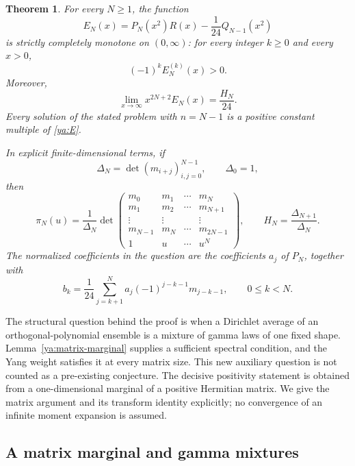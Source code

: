 \documentclass[11pt,a4paper]{article}
\newtheorem{theorem}{Theorem}[section]
\theoremstyle{definition}
\theoremstyle{remark}
\numberwithin{equation}{section}
\begin{document}
\begin{theorem}\label{ya:main}
For every $N\ge1$, the function
\begin{equation}\label{ya:E}
 E_N(x)=P_N(x^2)R(x)-\frac1{24}Q_{N-1}(x^2)
\end{equation}
is strictly completely monotone on $(0,\infty)$: for every integer
$k\ge0$ and every $x>0$,
\[
 (-1)^kE_N^{(k)}(x)>0.
\]
Moreover,
\begin{equation}\label{ya:asymptotic}
 \lim_{x\to\infty}x^{2N+2}E_N(x)=\frac{H_N}{24}.
\end{equation}
Every solution of the stated problem with $n=N-1$ is a positive
constant multiple of \eqref{ya:E}.

In explicit finite-dimensional terms, if
\[
 \Delta_N=\det(m_{i+j})_{i,j=0}^{N-1},\qquad \Delta_0=1,
\]
then
\begin{equation}\label{ya:determinant}
 \pi_N(u)=\frac1{\Delta_N}
 \det\begin{pmatrix}
 m_0&m_1&\cdots&m_N\\
 m_1&m_2&\cdots&m_{N+1}\\
 \vdots&\vdots&&\vdots\\
 m_{N-1}&m_N&\cdots&m_{2N-1}\\
 1&u&\cdots&u^N
 \end{pmatrix},\qquad
 H_N=\frac{\Delta_{N+1}}{\Delta_N}.
\end{equation}
The normalized coefficients in the question are the coefficients
$a_j$ of $P_N$, together with
\begin{equation}\label{ya:bcoefficients}
 b_k=\frac1{24}\sum_{j=k+1}^N
       a_j(-1)^{j-k-1}m_{j-k-1},\qquad 0\le k<N.
\end{equation}
\end{theorem}

The structural question behind the proof is when a Dirichlet average of
an orthogonal-polynomial ensemble is a mixture of gamma laws of one
fixed shape. Lemma~\ref{ya:matrix-marginal} supplies a sufficient
spectral condition, and the Yang weight satisfies it at every matrix size.
This new auxiliary question is not counted as a pre-existing conjecture.
The decisive positivity statement is obtained from a one-dimensional
marginal of a positive Hermitian matrix. We give the matrix argument
and its transform identity explicitly; no convergence of an infinite
moment expansion is assumed.

\subsection{A matrix marginal and gamma mixtures}
\end{document}
